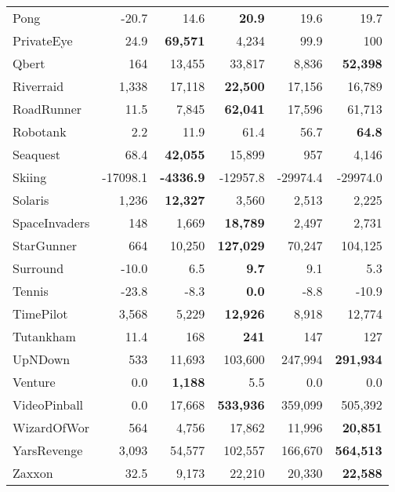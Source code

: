 \documentclass{article}
\begin{document}
\begin{table}[h]
\begin{tabular}{l r r r r r}
Pong                 & -20.7      & 14.6       & \textbf{20.9} & 19.6       & 19.7       \\
PrivateEye           & 24.9       & \textbf{69,571} & 4,234      & 99.9       & 100        \\
Qbert                & 164        & 13,455     & 33,817     & 8,836      & \textbf{52,398} \\
Riverraid            & 1,338      & 17,118     & \textbf{22,500} & 17,156     & 16,789     \\
RoadRunner           & 11.5       & 7,845      & \textbf{62,041} & 17,596     & 61,713     \\
Robotank             & 2.2        & 11.9       & 61.4       & 56.7       & \textbf{64.8} \\
Seaquest             & 68.4       & \textbf{42,055} & 15,899     & 957        & 4,146      \\
Skiing               & -17098.1   & \textbf{-4336.9} & -12957.8   & -29974.4   & -29974.0   \\
Solaris              & 1,236      & \textbf{12,327} & 3,560      & 2,513      & 2,225      \\
SpaceInvaders        & 148        & 1,669      & \textbf{18,789} & 2,497      & 2,731      \\
StarGunner           & 664        & 10,250     & \textbf{127,029} & 70,247     & 104,125    \\
Surround             & -10.0      & 6.5        & \textbf{9.7} & 9.1        & 5.3        \\
Tennis               & -23.8      & -8.3       & \textbf{0.0} & -8.8       & -10.9      \\
TimePilot            & 3,568      & 5,229      & \textbf{12,926} & 8,918      & 12,774     \\
Tutankham            & 11.4       & 168        & \textbf{241} & 147        & 127        \\
UpNDown              & 533        & 11,693     & 103,600    & 247,994    & \textbf{291,934} \\
Venture              & 0.0        & \textbf{1,188} & 5.5        & 0.0        & 0.0        \\
VideoPinball         & 0.0        & 17,668     & \textbf{533,936} & 359,099    & 505,392    \\
WizardOfWor          & 564        & 4,756      & 17,862     & 11,996     & \textbf{20,851} \\
YarsRevenge          & 3,093      & 54,577     & 102,557    & 166,670    & \textbf{564,513} \\
Zaxxon               & 32.5       & 9,173      & 22,210     & 20,330     & \textbf{22,588} \\
\bottomrule

    \end{tabular}

\end{table}
\end{document}
